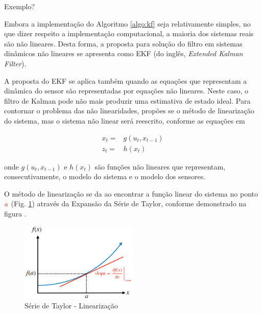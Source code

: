 Exemplo?


Embora a implementação do Algoritmo \ref{algo:kf} seja relativamente simples, no que dizer respeito a implementação computacional, a 
maioria dos sistemas reais são não lineares. Desta forma, a proposta para solução do filtro em sistemas dinâmicos não lineares se apresenta como
EKF (do inglês, \textit{Extended Kalman Filter}).

A proposta do EKF se aplica também quando as equações que representam a dinâmica do sensor são representadas por equações não lineares.
Neste caso, o filtro de Kalman pode não mais produzir uma estimativa de estado ideal. 
Para contornar o problema das não linearidades, propões se o método de linearização do sistema, mas o sistema não linear será reescrito, conforme as equações em 


    \begin{equation}
        \begin{split}
        x_t = & g(u_t, x_{t-1})\\
        z_t = & h(x_t)
        \end{split}
    \end{equation}
    
onde $g(u_t, x_{t-1})$ e $h(x_t)$ são funções não lineares que representam, consecutivamente, 
o modelo do sistema e o modelo dos sensores.





O método de linearização se da ao encontrar a função linear do sistema no ponto $\textcolor{red}{a}$ (Fig. \ref{fig:taylor}) através da Expansão da Série de Taylor, conforme demonstrado na figura .

\begin{figure}
    \centering
    \includegraphics[width=0.5\textwidth]{chapters/chapter3/figures/taylor.png}
    \caption{Série de Taylor - Linearização}
    \label{fig:taylor}
\end{figure}

